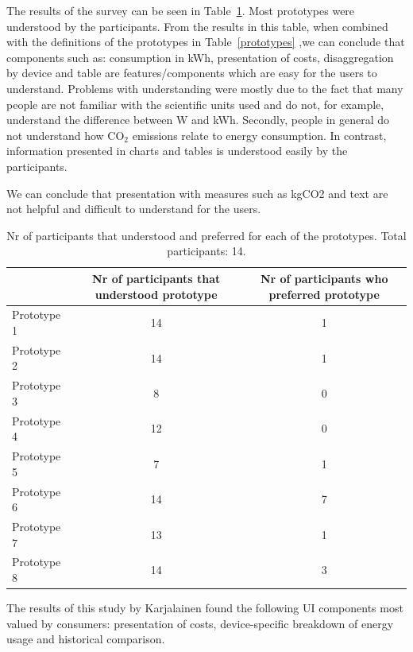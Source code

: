 \documentclass[journal]{vgtc}                %
\begin{document}
The results of the survey can be seen in Table~\ref{prototypesresults}. Most prototypes were understood by the participants. From the results in this table, when combined with the definitions of the prototypes in Table~\ref{prototypes} ,we can conclude that components such as: consumption in kWh, presentation of costs, disaggregation by device and table are features/components which are easy for the users to understand. Problems with understanding were mostly due to the fact that many people are not familiar with the scientific units used and do not, for example, understand the difference between W and kWh. Secondly, people in general do not understand how CO$_2$ emissions relate to energy consumption.
In contrast, information presented in charts and tables is understood easily by the participants.

We can conclude that presentation with measures such as kgCO2 and text are not helpful and difficult to understand for the users.


\begin{table}
  \caption{Nr of participants that understood and preferred for each of the prototypes. Total participants: 14. \cite{karjalainen2011consumer}}
  \label{prototypesresults}
  \scriptsize
  \begin{center}
    \begin{tabular}{|lcc|}
    \hline
       & \multicolumn{1}{p{2.5cm}}{\centering Nr of participants that understood prototype} & 
       \multicolumn{1}{p{3cm}|}{\centering Nr of participants who preferred prototype}  \\ \hline
       Prototype 1 & 14 & 1 \\ 
       Prototype 2 & 14 & 1 \\ 
       Prototype 3 & 8 & 0 \\ 
       Prototype 4 & 12 & 0 \\ 
       Prototype 5 & 7 & 1 \\ 
       Prototype 6 & 14 & 7 \\ 
       Prototype 7 & 13 & 1 \\ 
       Prototype 8 & 14 & 3 \\ \hline
    \end{tabular}
  \end{center}
\end{table}

The results of this study by Karjalainen found the following UI components most valued by consumers: presentation of costs, device-specific breakdown of energy usage and historical comparison.  %
\end{document}
